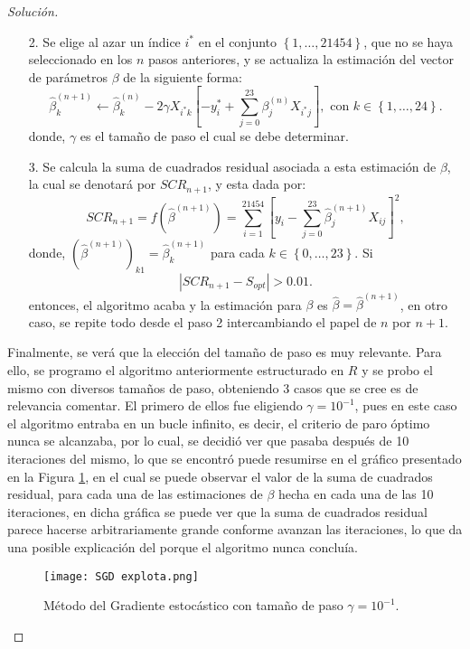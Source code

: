 \documentclass[10.5pt,notitlepage]{article}
\newenvironment{solucion}
  {\begin{proof}[Solución]}
  {\end{proof}}
\newcommand{\abs}[1]{\left\lvert #1 \right\rvert}
\newcommand{\corch}[1]{\left[ #1 \right]}
\newcommand{\kis}[1]{\left\{ #1 \right\}}
\theoremstyle{plain}
\begin{document}
\begin{solucion}
\begin{itemize}
    \item[2.] Se elige al azar un índice \(i^*\) en el conjunto \(\kis{1,\hdots,21454}\), que no se haya seleccionado en los \(n\) pasos anteriores, y se actualiza la estimación del vector de parámetros \(\beta\) de la siguiente forma:
    \[
      \hat{\beta}_{k}^{(n+1)} \leftarrow \hat{\beta}_{k}^{(n)} - 2\gamma X_{i^*k}\corch{-y_i^* + \sum_{j = 0}^{23}\beta_{j}^{(n)}X_{i^*j}}, \text{ con } k \in \kis{1, \hdots,24}.
    \]
    donde, \(\gamma\) es el tamaño de paso el cual se debe determinar.
    \item[3.] Se calcula la suma de cuadrados residual asociada a esta estimación de \(\beta\), la cual se denotará por \(SCR_{n+1}\), y esta dada por:
    \[
    SCR_{n+1} = f(\hat{\beta}^{(n+1)}) = \sum_{i = 1}^{21454}\corch{y_i - \sum_{j = 0}^{23}\hat{\beta}_{j}^{(n+1)}X_{ij} }^2,
    \]
    donde, \((\hat{\beta}^{(n+1)})_{k1} =  \hat{\beta}_{k}^{(n+1)}\) para cada \(k\in \kis{0,\hdots,23}\). Si 
    \[
    \abs{SCR_{n+1} - S_{opt}} > 0.01.
    \]
    entonces, el algoritmo acaba y la estimación para \(\beta\) es \( \hat{\beta} =\hat{\beta}^{(n+1)}\), en otro caso, se repite todo desde el paso 2 intercambiando el papel de \(n\) por \(n+1\).
\end{itemize}
Finalmente, se verá que la elección del tamaño de paso es muy relevante. Para ello, se programo el algoritmo anteriormente estructurado en \(R\) y se probo el mismo con diversos tamaños de paso, obteniendo 3 casos que se cree es de relevancia comentar. El primero de ellos fue eligiendo \(\gamma = 10^{-1}\), pues en este caso el algoritmo entraba en un bucle infinito, es decir, el criterio de paro óptimo nunca se alcanzaba, por lo cual, se decidió ver que pasaba después de 10 iteraciones del mismo, lo que se encontró puede resumirse en el gráfico presentado en la Figura \ref{fig:1}, en el cual se puede observar el valor de la suma de cuadrados residual, para cada una de las estimaciones de \(\beta\) hecha en cada una de las 10 iteraciones, en dicha gráfica se puede ver que la suma de cuadrados residual parece hacerse arbitrariamente grande conforme avanzan las iteraciones, lo que da una posible explicación del porque el algoritmo nunca concluía. 
\begin{figure}[htb]
    \centering
    \texttt{[image: SGD explota.png]}
    \caption{Método del Gradiente estocástico con tamaño de paso \(\gamma = 10^{-1}\).}
    \label{fig:1}
\end{figure}


\end{solucion}
\end{document}
